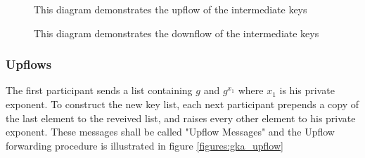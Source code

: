 \begin{figure}[t]
  \begin{minipage}{0.49\textwidth}
    \caption{This diagram demonstrates the upflow of the intermediate keys}    
    \label{figures:gka_upflow}
  \end{minipage}
  \begin{minipage}{0.49\textwidth}
    \caption{This diagram demonstrates the downflow of the intermediate keys}
    \label{figures:gka_downflow}
  \end{minipage}
\end{figure}

\subsubsection{Upflows}
The first participant sends a list containing $g$ and $g^{x_1}$ where $x_1$ is his private exponent. To construct the new key list, each next participant prepends a copy of the last element to the reveived list, and raises every other element to his private exponent. These messages shall be called "Upflow Messages" and the Upflow forwarding procedure is illustrated in figure \ref{figures:gka_upflow}
 
